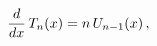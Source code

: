 \[\frac{d}{dx}\mathop{T_{n}\/}\nolimits\!\left(x\right)=n\mathop{U_{n-1}\/}%
\nolimits\!\left(x\right),\]